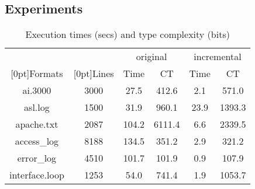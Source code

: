 \subsection{Experiments}
\begin{table}[th]
\begin{tabular}{|c|c|c|c|c|c|}\hline
& & \multicolumn{2}{|c|}{original} & \multicolumn{2}{|c|}{incremental} \\ \cline{3-6}
\raisebox{1.5ex}[0pt]{Formats} & \raisebox{1.5ex}[0pt]{Lines} &
	Time & CT & Time & CT \\ \hline \hline
ai.3000	&	3000	& 27.5	& 412.6	& 2.1	& 571.0	\\ \hline
asl.log  &	1500	& 31.9	& 960.1	& 23.9 	& 1393.3 \\ \hline
apache.txt  &	2087	& 104.2 & 6111.4& 6.6 	& 2339.5 \\ \hline
access\_log  &	8188 	& 134.5	& 351.2	& 2.9	& 321.2	\\ \hline
error\_log  &	4510	& 101.7	& 101.9	& 0.9	& 107.9 \\ \hline
interface.loop & 1253	& 54.0	& 741.4	& 1.9	& 1053.7 \\ \hline
\end{tabular}
\caption{Execution times (secs) and type complexity (bits)} 
\label{tab:results}
\end{table}


%
%

